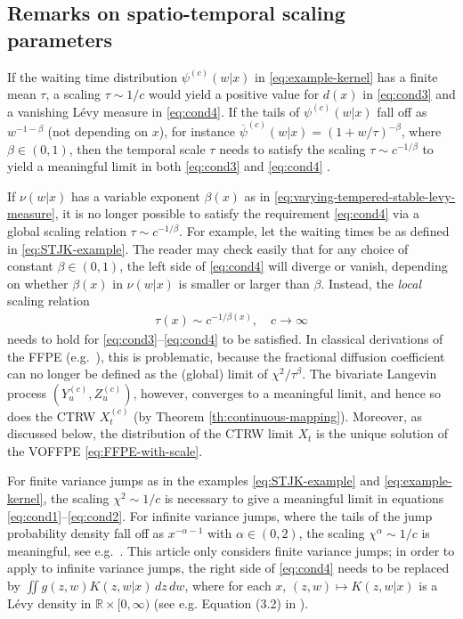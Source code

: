\documentclass[a4paper,12pt]{elsarticle}
\numberwithin{equation}{section}
\theoremstyle{plain}
\theoremstyle{definition}
\theoremstyle{remark}
\numberwithin{equation}{section}
\newcommand{\spc}{\mathbb R}
\newcommand{\spctim}{\spc \times [0,\infty)}
\newcommand{\1}{\mathbf 1}
\begin{document}
\subsection{Remarks on spatio-temporal scaling parameters} \label{sec:scaling}

If the waiting time distribution $\psi^{(c)}(w|x)$ in 
\eqref{eq:example-kernel} has a finite mean $\tau$, a scaling 
$\tau \sim 1/c$ would yield a positive value for $d(x)$ in 
\eqref{eq:cond3} and a vanishing L\'evy measure in \eqref{eq:cond4}.
If the tails of $\psi^{(c)}(w|x)$ fall off as $w^{-1-\beta}$
(not depending on $x$), 
for instance
$\overline \psi^{(c)}(w|x) = (1+w/\tau)^{-\beta}$,
where 
$\beta \in (0,1)$, then the temporal scale $\tau$ needs to satisfy the 
scaling $\tau \sim c^{-1/\beta}$ to yield a meaningful limit in both 
\eqref{eq:cond3} and \eqref{eq:cond4} \cite[Section 3.7]{MeerschaertSikorskii}. 

If $\nu(w|x)$ has a variable
exponent $\beta(x)$ as in \eqref{eq:varying-tempered-stable-levy-measure},
it is no longer possible to satisfy the requirement \eqref{eq:cond4} via a 
global scaling relation $\tau \sim c^{-1/\beta}$.
For example, let the waiting times be as defined in \eqref{eq:STJK-example}.
The reader may check easily that for any choice of constant 
$\beta \in (0,1)$, 
the left side of \eqref{eq:cond4} will diverge or vanish, depending 
on whether $\beta(x)$ in $\nu(w|x)$ is smaller or larger than $\beta$.
Instead, the \emph{local} scaling relation
\begin{align}
  \tau(x) \sim c^{-1/\beta(x)}, \quad c \to \infty
\end{align}
needs to hold for \eqref{eq:cond3}--\eqref{eq:cond4} to be satisfied. 
In classical derivations of the FFPE (e.g.\ \cite{BMK00}), this is 
problematic, because the fractional diffusion coefficient can no longer be 
defined as the (global) limit of $\chi^2 / \tau^\beta$. 
The bivariate Langevin process $(Y_u^{(c)}, Z_u^{(c)})$, however, converges 
to a meaningful limit, and hence so does the CTRW $X_t^{(c)}$ (by Theorem 
\ref{th:continuous-mapping}).
Moreover, as discussed below, the distribution of the CTRW limit $X_t$ is 
the unique solution of the VOFFPE \eqref{eq:FFPE-with-scale}. 

For finite variance jumps as in the examples \eqref{eq:STJK-example}
and \eqref{eq:example-kernel}, 
the scaling $\chi^2 \sim 1/c$ is necessary to give a meaningful limit 
in equations \eqref{eq:cond1}--\eqref{eq:cond2}. 
For infinite variance jumps, where the tails of the jump probability 
density fall off as $x^{-\alpha-1}$ with $\alpha \in (0,2)$, 
the scaling $\chi^\alpha \sim 1/c$ is meaningful, see e.g.\ 
\cite[Section 3.8]{MeerschaertSikorskii}. 
This article only considers finite variance jumps; 
in order to apply to infinite variance jumps, the right side of \eqref{eq:cond4} 
needs to be replaced by 
$\iint g(z,w) K(z,w|x)\,dz\,dw$,
where for each $x$, $(z,w) \mapsto K(z,w|x)$ is a L\'evy density in 
$\spctim$ (see e.g. Equation (3.2) in \cite{BMMST}).
\end{document}
